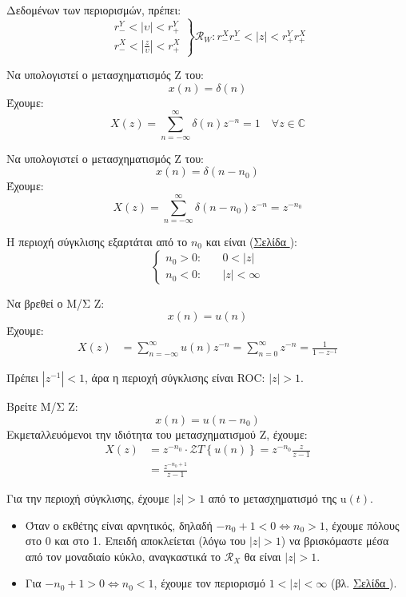 \documentclass[11pt,a4paper,notitlepage,fleqn]{article}
\begin{document}
\begin{enumpar}
    Δεδομένων των περιορισμών, πρέπει:
    \[
    \left.
    \begin{matrix}
    r_-^Y < |υ| < r_+^Y\\
    r_-^X < \left|\frac{z}{υ}\right| < r_+^X
    \end{matrix}
    \right\rbrace
    \mathcal{R}_W: r_-^Xr_-^Y < |z| < r_+^Yr_+^X
    \]
\end{enumpar}

\begin{exercise}
	Να υπολογιστεί ο μετασχηματισμός Z του:
	\[
	x(n) = δ(n)
	\]
	\tcblower
	Έχουμε:
	\[
	X(z) = \sum_{n=-\infty}^{\infty} δ(n)z^{-n} = 1 \quad \forall z\in \mathbb C 
	\]
\end{exercise}

\begin{exercise}
	Να υπολογιστεί ο μετασχηματισμός Z του:
	\[
	x(n) = δ(n-n_0)
	\]
	\tcblower
	Έχουμε:
	\[
	X(z) = \sum_{n=-\infty}^{\infty} δ(n-n_0)z^{-n} = z^{-n_0}
	\]
	
	Η περιοχή σύγκλισης εξαρτάται από το \( n_0 \) και είναι (\hyperref[sec:znroc]{Σελίδα \pageref{sec:znroc}}):
	\[
	\begin{cases}
	n_0 > 0: &\quad 0 < |z|\\
	n_0 < 0: &\quad |z| < \infty
	\end{cases}
	\]
\end{exercise}

\begin{exercise}
	Να βρεθεί ο Μ/Σ Z:
	\[
	x(n) = u(n)
	\]
	\tcblower
	Έχουμε:
	\begin{align*}
		X(z) &= \sum_{n=-\infty}^\infty u(n)z^{-n} = \sum_{n=0}^{\infty} z^{-n}
		= \frac{1}{1-z^{-1}}
	\end{align*}
	
	Πρέπει \( |z^{-1}| < 1 \), άρα η περιοχή σύγκλισης είναι ROC: \( |z|>1 \).
\end{exercise}

\begin{exercise}
	Βρείτε Μ/Σ Z:
	\[
	x(n) = u(n-n_0)
	\]
	\tcblower
	Εκμεταλλευόμενοι την ιδιότητα του μετασχηματισμού Z, έχουμε:
	\begin{align*}
		X(z) &=z^{-n_0} \cdot \mathcal{Z}T\left\lbrace u(n) \right\rbrace
		= z^{-n_0}\frac{z}{z-1}
		\\ &= \frac{z^{-n_0+1}}{z-1}
	\end{align*}
	
	Για την περιοχή σύγκλισης, έχουμε \( |z|>1 \) από το μετασχηματισμό της
	\( \mathrm{u}(t) \).
	\begin{itemize}
		\item Όταν ο εκθέτης είναι αρνητικός, δηλαδή \( -n_0+1 < 0 \iff n_0 > 1 \), έχουμε
		πόλους στο 0 και στο 1. Επειδή αποκλείεται (λόγω του \( |z|>1 \)) να
		βρισκόμαστε μέσα από τον μοναδιαίο κύκλο, αναγκαστικά το \( \mathcal{R}_X \) θα
		είναι \( |z|>1 \).
		\item Για \( -n_0 + 1 > 0 \iff n_0 < 1 \), έχουμε τον περιορισμό \( 1<|z|<\infty \) (βλ. \hyperref[sec:znroc]{Σελίδα \pageref{sec:znroc}}).
	\end{itemize}
\end{exercise}
\end{document}
